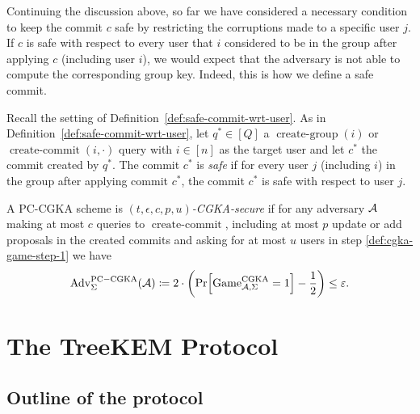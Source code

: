 Continuing the discussion above, so far we have considered a necessary condition to keep the commit $c$ safe by restricting the corruptions made to a specific user $j$. If $c$ is safe with respect to every user that $i$ considered to be in the group after applying $c$ (including user $i$), we would expect that the adversary is not able to compute the corresponding group key. Indeed, this is how we define a safe commit.

\begin{definition} \label{def:safe-commit}
	Recall the setting of Definition~\ref{def:safe-commit-wrt-user}. As in Definition~\ref{def:safe-commit-wrt-user}, let $q^* \in [Q]$ a $\operatorname{create-group}(i)$ or $\operatorname{create-commit}(i, \cdot)$ query with $i \in [n]$ as the target user and let $c^*$ the commit created by $q^*$. The commit $c^*$ is \emph{safe} if for every user $j$ (including $i$) in the group after applying commit $c^*$, the commit $c^*$ is safe with respect to user $j$.
\end{definition}


\begin{definition}
	A PC-CGKA scheme is \emph{$(t, \epsilon, c, p, u)$-CGKA-secure} if for any adversary $\mathcal{A}$ making at most $c$ queries to $\operatorname{create-commit}$, including at most $p$ update or add proposals in the created commits and asking for at most $u$ users in step \ref{def:cgka-game-step-1} we have
	\begin{align*}
		\mathrm{Adv}_{\Sigma}^{\mathrm{PC-CGKA}}(\adv) \coloneqq 2 \cdot \left(\pr{\mathrm{Game}_{\adv, \Sigma}^{\mathrm{CGKA}} = 1} - \frac{1}{2}\right) \le \epsilon.
	\end{align*}
\end{definition}

\section{The TreeKEM Protocol}


\subsection{Outline of the protocol}

